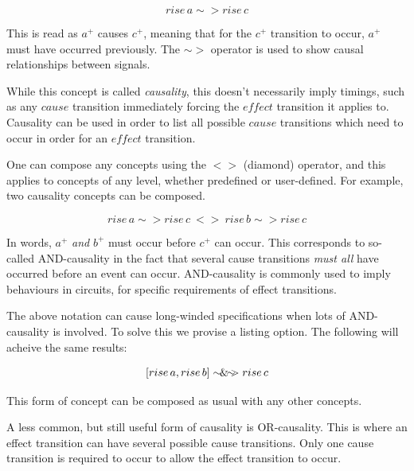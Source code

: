 \documentclass[british,conference,compsoc]{IEEEtran}
\begin{document}
\[
rise\,a \sim> rise\,c
\]

\vspace{-1mm}

This is read as $a^{+}$ causes $c^{+}$, meaning that for the $c^{+}$ transition 
to occur, $a^{+}$ must have occurred previously. The $\sim>$ 
operator is used to show causal relationships between signals.
 
While this concept is called \emph{causality}, this doesn't necessarily imply
timings, such as any $\mathit{cause}$ transition immediately forcing the
 $\mathit{effect}$ transition it applies to. Causality can be used in order to
list all possible $\mathit{cause}$ transitions which need to occur in order
 for an $\mathit{effect}$ transition.

One can compose any concepts using the $<>$ (diamond) operator, and this applies
to concepts of any level, whether predefined or user-defined. For example, 
two causality concepts can be composed.

\vspace{-3mm}

\[
rise\,a\sim> rise\,c\ <> \ rise\,b\sim> rise\,c
\]

\vspace{-1mm}

In words, $a^{+}$ \emph{and} $b^{+}$ must occur before $c^{+}$ can occur. 
This corresponds to so-called AND-causality in the fact that several cause 
transitions \emph{must all} have occurred before an event can occur. 
AND-causality is commonly used to imply behaviours in circuits, for specific 
requirements of effect transitions.  

The above notation can cause long-winded specifications when lots of 
AND-causality is involved. To solve this we provise a listing option. The 
following will acheive the same results:

\vspace{-3mm}

\[
[rise\,a, rise\,b]\sim\hspace{-1.5mm}\&\hspace{-1.5mm}\sim\hspace{-1.5mm}>rise\,c
\]

\vspace{-1mm}

This form of concept can be composed as usual with any other concepts.

A less common, but still useful form of causality is OR-causality. This is 
where an effect transition can have several possible cause transitions. Only 
one cause transition is required to occur to allow the effect transition to 
occur. 
\end{document}

